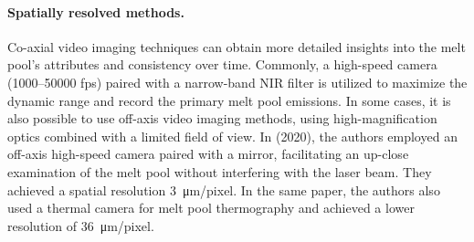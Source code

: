 \paragraph{Spatially resolved methods.} Co-axial video imaging techniques can obtain more detailed insights into the melt pool's attributes and consistency over time. Commonly, a high-speed camera (\numrange{1000}{50000} \unit{fps}) paired with a narrow-band NIR filter is utilized to maximize the dynamic range and record the primary melt pool emissions. In some cases, it is also possible to use off-axis video imaging methods, using high-magnification optics combined with a limited field of view. In \citeauthor{lane_measurements_2020} (2020), the authors employed an off-axis high-speed camera paired with a mirror, facilitating an up-close examination of the melt pool without interfering with the laser beam. They achieved a spatial resolution \SI{3}{\micro\metre / pixel}. In the same paper, the authors also used a thermal camera for melt pool thermography and achieved a lower resolution of \SI{36}{\micro \metre / pixel}.
